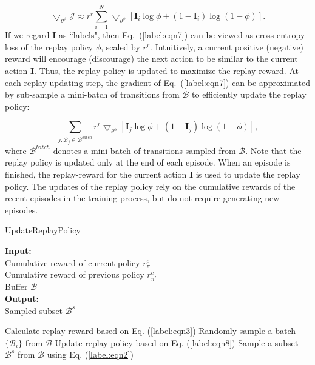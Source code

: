 \documentclass{article}
\begin{document}
\begin{equation}
\label{label:eqn7}
      \bigtriangledown_{\theta^\phi} \mathcal{J} \approx r^{r} \sum_{i=1}^{N} \bigtriangledown_{\theta^\phi} [\textbf{I}_i \log \phi + (1-\textbf{I}_i) \log (1-\phi)].
\end{equation}
If we regard \textbf{I} as ``labels", then Eq.~(\ref{label:eqn7}) can be viewed as cross-entropy loss of the replay policy $\phi$, scaled by $r^{r}$. Intuitively, a current positive (negative) reward will encourage (discourage) the next action to be similar to the current action \textbf{I}. Thus, the replay policy is updated to maximize the replay-reward. At each replay updating step, the gradient of Eq.~(\ref{label:eqn7}) can be approximated by sub-sample a mini-batch of transitions from $\mathcal{B}$ to efficiently update the replay policy:

\begin{equation}
\label{label:eqn8}
       \sum_{j : \mathcal{B}_j \in \mathcal{B}^{batch}} r^{r} \bigtriangledown_{\theta^\phi} [\textbf{I}_j \log \phi + (1-\textbf{I}_j) \log (1-\phi)],
\end{equation}
where $\mathcal{B}^{batch}$ denotes a mini-batch of transitions sampled from $\mathcal{B}$. Note that the replay policy is updated only at the end of each episode. When an episode is finished, the replay-reward for the current action \textbf{I} is used to update the replay policy. The updates of the replay policy rely on the cumulative rewards of the recent episodes in the training process, but do not require generating new episodes.

\begin{algorithm}[t]
\caption{UpdateReplayPolicy}
\label{label:alg2}
\textbf{Input:}\\
\hspace*{\algorithmicindent}Cumulative reward of current policy $r^{c}_{\pi}$\\
\hspace*{\algorithmicindent}Cumulative reward of previous policy $r^{c}_{\pi'}$\\
\hspace*{\algorithmicindent}Buffer $\mathcal{B}$ \\
\textbf{Output:} \\
\hspace*{\algorithmicindent}Sampled subset $\mathcal{B}^s$
 \
\begin{algorithmic}[1]
    
    \STATE Calculate replay-reward based on Eq. (\ref{label:eqn3})
    \FOR{each replay updating step}
        \STATE Randomly sample a batch $\{\mathcal{B}_i\}$ from $\mathcal{B}$
        \STATE Update replay policy based on Eq. (\ref{label:eqn8})
    \ENDFOR
    \STATE Sample a subset $\mathcal{B}^s$ from $\mathcal{B}$ using Eq. (\ref{label:eqn2})
\end{algorithmic}
\end{algorithm}
\end{document}
